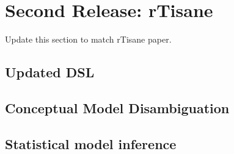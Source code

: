 \section{Second Release: rTisane} \label{sec:rTisane}
{\color{orange} Update this section to match rTisane paper.}

\subsection{Updated DSL}
\subsection{Conceptual Model Disambiguation}
\subsection{Statistical model inference}